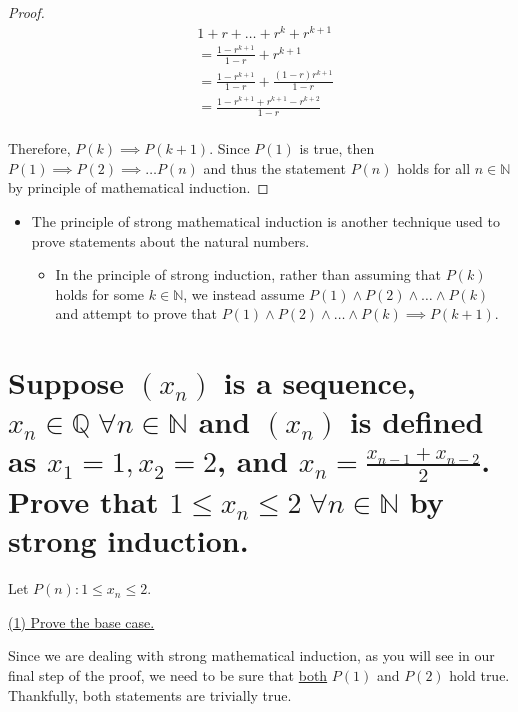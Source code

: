 \documentclass{article}
\begin{document}
\begin{proof}
\begin{align*}
	&1 + r + \ldots + r^k + r^{k + 1} \\
	&= \frac{1 - r^{k + 1}}{1 - r} + r^{k + 1} \\
	&= \frac{1 - r^{k + 1}}{1 - r} + \frac{(1 - r)r^{k + 1}}{1 - r} \\
	&=\frac{1 - r^{k + 1} + r^{k + 1} - r^{k + 2}}{1 - r} \\
\end{align*}

Therefore, $P(k) \implies P(k + 1)$. Since $P(1)$ is true, then $P(1) \implies P(2) \implies \ldots P(n)$ and thus the statement $P(n)$ holds for all $n \in \mathbb{N}$ by principle of mathematical induction.

\end{proof}

\begin{itemize}
	\item The principle of strong mathematical induction is another technique used to prove statements about the natural numbers.
	\begin{itemize}
		\item In the principle of strong induction, rather than assuming that $P(k)$ holds for some $k \in \mathbb{N}$, we instead assume $P(1) \wedge P(2) \wedge \ldots \wedge P(k)$ and attempt to prove that $P(1) \wedge P(2) \wedge \ldots \wedge P(k) \implies P(k + 1)$.
	\end{itemize}
\end{itemize}

\section[Example ~\thesection]{Suppose $(x_n)$ is a sequence, $x_n \in \mathbb{Q} \; \forall n \in \mathbb{N}$ and $(x_n)$ is defined as $x_1 = 1, x_2 = 2$, and $x_n = \frac{x_{n - 1} + x_{n - 2}}{2}$. Prove that $1 \le x_n \le 2 \; \forall n \in \mathbb{N}$ by strong induction.}

Let $P(n): 1 \le x_n \le 2$.

\begin{center}
	\large{\underline{(1) Prove the base case.}}
\end{center}

\vspace{.3cm}

Since we are dealing with strong mathematical induction, as you will see in our final step of the proof, we need to be sure that \underline{both} $P(1)$ and $P(2)$ hold true. Thankfully, both statements are trivially true.
\end{document}
